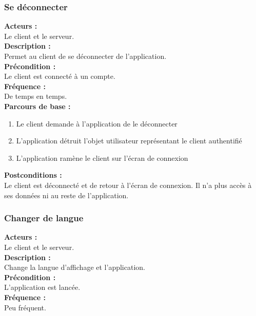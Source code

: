 \documentclass[../rapport.tex]{subfiles}
\begin{document}
\subsubsection{Se déconnecter}

\textbf{Acteurs :} \\
Le client et le serveur. \\

\textbf{Description :} \\
Permet au client de se déconnecter de l'application. \\

\textbf{Précondition :} \\
Le client est connecté à un compte. \\

\textbf{Fréquence :} \\
De temps en temps. \\

\textbf{Parcours de base :} \\
\begin{enumerate}
    \item Le client demande à l'application de le déconnecter
    \item L'application détruit l'objet utilisateur représentant le client authentifié
    \item L'application ramène le client sur l'écran de connexion
\end{enumerate}
\bigskip

\textbf{Postconditions :} \\
Le client est déconnecté et de retour à l'écran de connexion. Il n'a plus accès à ses données ni au reste de l'application.



\subsubsection{Changer de langue}

\textbf{Acteurs :} \\
Le client et le serveur. \\

\textbf{Description :} \\
Change la langue d'affichage et l'application. \\

\textbf{Précondition :} \\
L'application est lancée. \\

\textbf{Fréquence :} \\
Peu fréquent. \\
\end{document}
